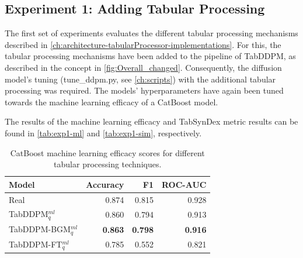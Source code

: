 \subsection{Experiment 1: Adding Tabular Processing}
\label{ch:Experiment-1}

The first set of experiments evaluates the different tabular processing mechanisms described in \autoref{ch:architecture-tabularProcessor-implementations}.
For this, the tabular processing mechanisms have been added to the pipeline of TabDDPM, as described in the concept in \autoref{fig:Overall_changed}.
Consequently, the diffusion model's tuning (tune\_ddpm.py, see \autoref{ch:scripts}) with the additional tabular processing was required.
The models' hyperparameters have again been tuned towards the machine learning efficacy of a CatBoost model.

The results of the machine learning efficacy and TabSynDex metric results can be found in \autoref{tab:exp1-ml} and \autoref{tab:exp1-sim}, respectively.
\begin{table}[h]
	\centering
	\begin{tabular}{lrrr}
		\toprule
		\textbf{Model}         & \textbf{Accuracy} & \textbf{F1}    & \textbf{ROC-AUC} \\
		\midrule
		Real                   & 0.874              & 0.815          & 0.928            \\
		TabDDPM$^{ml}_{q}$     & 0.860              & 0.794          & 0.913            \\
		TabDDPM-BGM$^{ml}_{q}$ & \textbf{0.863}     & \textbf{0.798} & \textbf{0.916}   \\
		TabDDPM-FT$^{ml}_{q}$  & 0.785              & 0.552          & 0.821            \\
		\bottomrule
	\end{tabular}
	\caption[Experiment 1 ML-Efficacy]{CatBoost machine learning efficacy scores for different tabular processing techniques.}
	\label{tab:exp1-ml}
\end{table}

